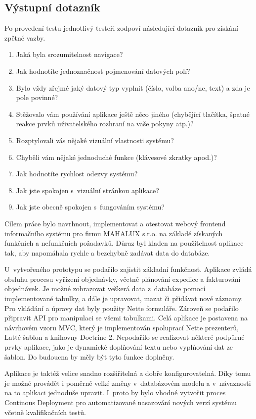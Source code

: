 \documentclass[thesis=B,czech]{FITthesis}[2012/06/26]
\begin{document}
\subsection{Výstupní dotazník}
	Po provedení testu jednotlivý testeři zodpoví následující dotazník pro získání zpětné vazby.
	\begin{enumerate}
		\item Jaká byla srozumitelnost navigace?
		\item Jak hodnotíte jednoznačnost pojmenování datových polí?
		\item Bylo vždy zřejmé jaký datový typ vyplnit (číslo, volba ano/ne, text) a zda je pole povinné?
		\item Stěžovalo vám používání aplikace ještě něco jiného (chybějící tlačítka, špatné reakce prvků uživatelského rozhraní na vaše pokyny atp.)?
		\item Rozptylovali vás nějaké vizuální vlastnosti systému?
		\item Chyběli vám nějaké jednoduché funkce (klávesové zkratky apod.)?
		\item Jak hodnotíte rychlost odezvy systému?
		\item Jak jste spokojen s~vizuální stránkou aplikace?
		\item Jak jste obecně spokojen s~fungováním systému?
	\end{enumerate}



\begin{conclusion}
	Cílem práce bylo navrhnout, implementovat a otestovat webový frontend informačního systému pro firmu MAHALUX s.r.o. na základě získaných funkčních a nefunkčních požadavků. Důraz byl kladen na použitelnost aplikace tak, aby napomáhala rychle a bezchybně zadávat data do databáze.
	
	U~vytvořeného prototypu se podařilo zajistit základní funkčnost. Aplikace zvládá obsluhu procesu vyřízení objednávky, včetně plánování expedice a fakturování objednávek. Je možné zobrazovat veškerá data z~databáze pomocí implementované tabulky, a dále je upravovat, mazat či přidávat nové záznamy. Pro vkládání a úpravy dat byly použity Nette formuláře. Zároveň se podařilo připravit API pro manipulaci se všemi tabulkami. Celá aplikace je postavena na návrhovém vzoru MVC, který je implementován spoluprací Nette prezenterů, Latté šablon a knihovny Doctrine 2. Nepodařilo se realizovat některé podpůrné prvky aplikace, jako je dynamické doplňování textu nebo vyplňování dat ze šablon. Do budoucna by měly být tyto funkce doplněny. 
	
	Aplikace je taktéž velice snadno rozšiřitelná a dobře konfigurovatelná. Díky tomu je možné provádět i poměrně velké změny v~databázovém modelu a v~návaznosti na to aplikaci jednoduše upravit. I~proto by bylo vhodné vytvořit proces Continous Deployment pro automatizované nasazování nových verzí systému včetně kvalifikačních testů.
\end{conclusion}
\end{document}
